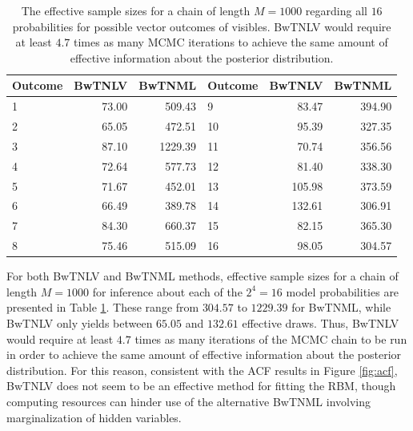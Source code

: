 \documentclass[]{article}
\theoremstyle{definition}
\begin{document}
\begin{table}[ht]
\centering
\begin{tabular}{lrrlrr}
  \hline
Outcome & BwTNLV & BwTNML & Outcome & BwTNLV & BwTNML \\ 
  \hline
1 & 73.00 & 509.43 & 9 & 83.47 & 394.90 \\ 
  2 & 65.05 & 472.51 & 10 & 95.39 & 327.35 \\ 
  3 & 87.10 & 1229.39 & 11 & 70.74 & 356.56 \\ 
  4 & 72.64 & 577.73 & 12 & 81.40 & 338.30 \\ 
  5 & 71.67 & 452.01 & 13 & 105.98 & 373.59 \\ 
  6 & 66.49 & 389.78 & 14 & 132.61 & 306.91 \\ 
  7 & 84.30 & 660.37 & 15 & 82.15 & 365.30 \\ 
  8 & 75.46 & 515.09 & 16 & 98.05 & 304.57 \\ 
   \hline
\end{tabular}
\caption{The effective sample sizes for a chain of length $M = 1000$ regarding all $16$ probabilities for possible vector outcomes of visibles. BwTNLV would require at least $4.7$ times as many MCMC iterations to achieve the same amount of effective information about the posterior distribution.} 
\label{tab:m-eff}
\end{table}
For both BwTNLV and BwTNML methods, effective sample sizes for a chain
of length \(M = 1000\) for inference about each of the \(2^4 = 16\)
model probabilities are presented in Table \ref{tab:m-eff}. These range
from \(304.57\) to \(1229.39\) for BwTNML, while BwTNLV only yields
between \(65.05\) and \(132.61\) effective draws. Thus, BwTNLV would
require at least \(4.7\) times as many iterations of the MCMC chain to
be run in order to achieve the same amount of effective information
about the posterior distribution. For this reason, consistent with the
ACF results in Figure \ref{fig:acf}, BwTNLV does not seem to be an
effective method for fitting the RBM, though computing resources can
hinder use of the alternative BwTNML involving marginalization of hidden
variables.
\end{document}
